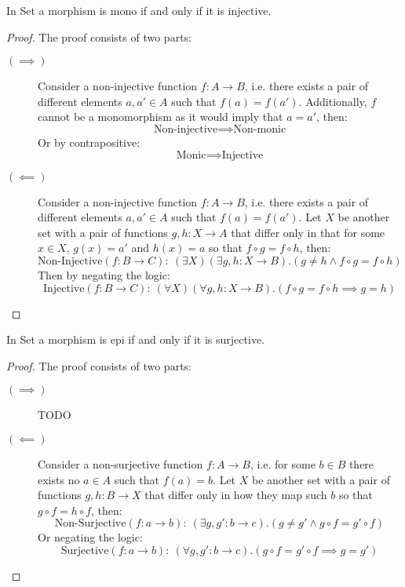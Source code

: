 \begin{theorem}
  In Set a morphism is mono if and only if it is injective.

  \begin{proof}
    The proof consists of two parts:
    \begin{description}
      \item[$(\implies)$] Consider a non-injective function $f:A\to B$, i.e.
        there exists a pair of different elements $a,a'\in A$ such that
        $f(a)=f(a')$. Additionally, $f$ cannot be a monomorphism as it would
        imply that $a=a'$, then:
        \[\text{Non-injective} \implies \text{Non-monic}\]
        Or by contrapositive:
        \[\text{Monic} \implies \text{Injective}\]
      \item[$(\impliedby)$] Consider a non-injective function $f:A\to B$, i.e.
        there exists a pair of different elements $a,a'\in A$ such that
        $f(a)=f(a')$. Let $X$ be another set with a pair of functions $g,
        h:X\to A$ that differ only in that for some $x\in X$, $g(x)=a'$ and
        $h(x)=a$ so that $f\circ g = f\circ h$, then:
        \[\text{Non-Injective}(f:B\to C):\ (\exists X)(\exists g,h:X\to
        B).(g \neq h \land f\circ g = f\circ h)\] Then by negating the logic:
        \[\text{Injective}(f:B\to C):\ (\forall X)(\forall g, h:X\to B).(f\circ
        g = f\circ h \implies g=h)\]
    \end{description}
  \end{proof}
\end{theorem}

\begin{theorem}
  In Set a morphism is epi if and only if it is surjective.

  \begin{proof}
    The proof consists of two parts:
    \begin{description}
      \item[$(\implies)$] TODO
      \item[$(\impliedby)$] Consider a non-surjective function $f:A\to B$, i.e.
        for some $b\in B$ there exists no $a\in A$ such that $f(a) = b$. Let $X$
        be another set with a pair of functions $g, h:B\to X$ that differ only
        in how they map such $b$ so that $g\circ f = h\circ f$, then:
        \[\text{Non-Surjective}(f:a\to b):\ (\exists g, g':b\to c).(g \neq
        g' \land g\circ f = g'\circ f)\]
        Or negating the logic:
        \[\text{Surjective}(f:a\to b):\ (\forall g, g':b\to c).(g\circ f =
          g'\circ f \implies g=g')\]
    \end{description}
  \end{proof}
\end{theorem}

